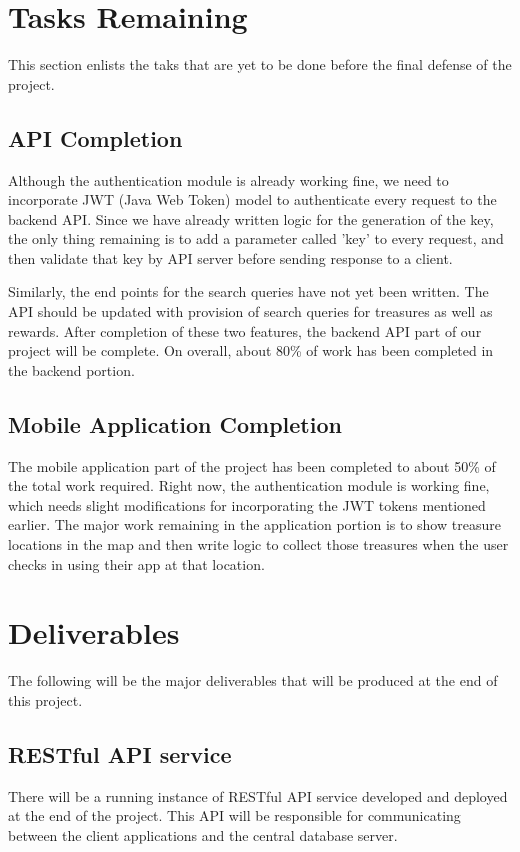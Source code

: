 \documentclass[12pt, a4paper, oneside]{article}
\begin{document}
\pagebreak
\section{Tasks Remaining}
This section enlists the taks that are yet to be done before the final defense of the project.

\subsection{API Completion}
Although the authentication module is already working fine, we need to incorporate JWT (Java Web Token) model to authenticate every request to the backend API. Since we have already written logic for the generation of the key, the only thing remaining is to add a parameter called 'key' to every request, and then validate that key by API server before sending response to a client.

Similarly, the end points for the search queries have not yet been written. The API should be updated with provision of search queries for treasures as well as rewards. After completion of these two features, the backend API part of our project will be complete. On overall, about 80\% of work has been completed in the backend portion.

\subsection{Mobile Application Completion}
The mobile application part of the project has been completed to about 50\% of the total work required. Right now, the authentication module is working fine, which needs slight modifications for incorporating the JWT tokens mentioned earlier. The major work remaining in the application portion is to show treasure locations in the map and then write logic to collect those treasures when the user checks in using their app at that location.

\pagebreak
\section{ Deliverables}
The following will be the major deliverables that will be produced at the end of this project.

\subsection{RESTful API service}
There will be a running instance of RESTful API service developed and deployed at the end of the project. This API will be responsible for communicating between the client applications and the central database server.
\end{document}
